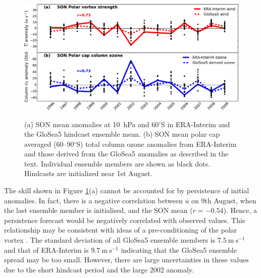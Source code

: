 \begin{figure}[t]
  \noindent\includegraphics[width=\textwidth,angle=0]{figures/chapter-seasonal/zmzw_ozone_crop.pdf}\\
  \caption[GloSea5 forecast skill for the stratospheric polar vortex strength
  and column ozone.]{(a) SON mean anomalies at 10~hPa and 60$^{\circ}$S in
    ERA-Interim and the GloSea5 hindcast ensemble mean. (b) SON mean polar cap
    averaged (60--90$^{\circ}$S) total column ozone anomalies from ERA-Interim
    and those derived from the GloSea5 anomalies as described in the
    text. Individual ensemble members are shown as black dots. Hindcasts are
    initialized near 1st August.}\label{fig:zmzw_ozone}
\end{figure}

The skill shown in Figure \ref{fig:zmzw_ozone}(a) cannot be accounted for by
persistence of initial anomalies. In fact, there is a negative correlation
between $\overline{u}$ on 9th August, when the last ensemble member is
initialised, and the SON mean ($r=-0.54$). Hence, a persistence forecast would
be negatively correlated with observed values. This relationship may be
consistent with ideas of a pre-conditioning of the polar vortex
\citep[e.g.,][]{McIntyre1983}. The standard deviation of all GloSea5 ensemble
members is $7.5~\mathrm{m~s^{-1}}$ and that of ERA-Interim is
$9.7~\mathrm{m~s^{-1}}$ indicating that the GloSea5 ensemble spread may be too
small. However, there are large uncertainties in these values due to the short
hindcast period and the large 2002 anomaly.

